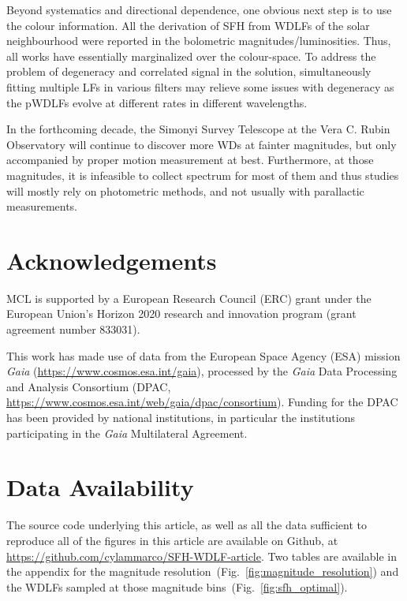 \documentclass[fleqn,usenatbib]{mnras}
\begin{document}
Beyond systematics and directional dependence, one obvious next step is to use
the colour information. All the derivation of SFH from WDLFs of the solar 
neighbourhood were reported in the bolometric magnitudes/luminosities. Thus,
all works have essentially marginalized over the colour-space. To address the
problem of degeneracy and correlated signal in the solution, simultaneously
fitting multiple LFs in various filters may relieve some issues with degeneracy
as the pWDLFs evolve at different rates in different wavelengths.

In the forthcoming decade, the Simonyi Survey Telescope at the Vera C. Rubin
Observatory will continue to discover more WDs at fainter magnitudes, but only
accompanied by proper motion measurement at best. Furthermore, at those
magnitudes, it is infeasible to collect spectrum for most of them and thus
studies will mostly rely on photometric methods, and not usually with
parallactic measurements.

\section*{Acknowledgements}
MCL is supported by a European Research Council (ERC) grant under the European
Union’s Horizon 2020 research and innovation program (grant agreement number
833031).

This work has made use of data from the European Space Agency (ESA) mission
{\it Gaia} (\url{https://www.cosmos.esa.int/gaia}), processed by the {\it Gaia}
Data Processing and Analysis Consortium (DPAC,
\url{https://www.cosmos.esa.int/web/gaia/dpac/consortium}). Funding for the DPAC
has been provided by national institutions, in particular the institutions
participating in the {\it Gaia} Multilateral Agreement.


\section*{Data Availability}
The source code underlying this article, as well as all the data sufficient to
reproduce all of the figures in this article are available on Github, at 
\url{https://github.com/cylammarco/SFH-WDLF-article}. Two tables are available
in the appendix for the magnitude
resolution~(Fig.~\ref{fig:magnitude_resolution}) and the WDLFs sampled at those
magnitude bins~(Fig.~\ref{fig:sfh_optimal}).
\end{document}
